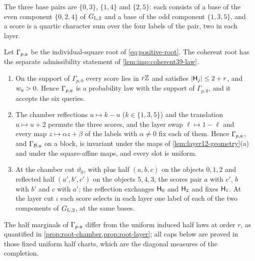 The three base pairs are $\{0,3\}$, $\{1,4\}$ and $\{2,5\}$: each consists of a base of the
even component $\{0,2,4\}$ of $G_{\rm L,2}$ and a base of the odd component $\{1,3,5\}$, and
a score is a quartic character sum over the four labels of the pair, two in each layer.

\begin{lemma}\label{lem:positive-root-properties}
Let $\Gamma_{p,\mathsf u}$ be the individual-square root of
\eqref{eq:positive-root}. The coherent root has the separate admissibility statement of
\cref{lem:imp:coherent39-law}.
\begin{enumerate}[label=(\alph*)]
\item On the support of $\Gamma_{p,0}$ every score lies in $r\mathbb Z$ and satisfies
 $|\mathsf H_{j}|\le2+r$, and $w_\mathsf u>0$. Hence $\Gamma_{p,\mathsf u}$ is a probability law with the
 support of $\Gamma_{p,0}$, and it accepts the six queries.
\item The chamber reflections $u\mapsto k-u$ ($k\in\{1,3,5\}$) and the translation
 $u\mapsto u+2$ permute the three scores, and the layer swap $\ell\mapsto1-\ell$ and every
 map $z\mapsto\alpha z+\beta$ of the labels with $\alpha\ne0$ fix each of them. Hence
 $\Gamma_{p,\mathsf u}$, and $\Gamma_{\mathcal B,\mathsf u}$ on a block, is invariant under the maps of
 \cref{lem:layer12-geometry}(a) and under the square-affine maps, and every slot is
 uniform.
\item At the chamber cut $\vartheta_0$, with plus half $(a,b,c)$ on the objects
 $0,1,2$ and reflected half $(a',b',c')$ on the objects $5,4,3$, the scores pair $a$
 with $c'$, $b$ with $b'$ and $c$ with $a'$; the reflection exchanges $\mathsf H_{0}$ and $\mathsf H_{2}$
 and fixes $\mathsf H_{1}$. At the layer cut $\iota$ each score selects in each layer one label of
 each of the two components of $G_{\rm L,2}$, at the same bases.
\end{enumerate}
The half marginals of $\Gamma_{p,\mathsf u}$ differ from the uniform induced half laws at
order $r$, as quantified in \cref{prop:root-chamber,prop:root-layer}; all caps
below are proved in those fixed uniform half charts, which are the
diagonal measures of the completion.
\end{lemma}

